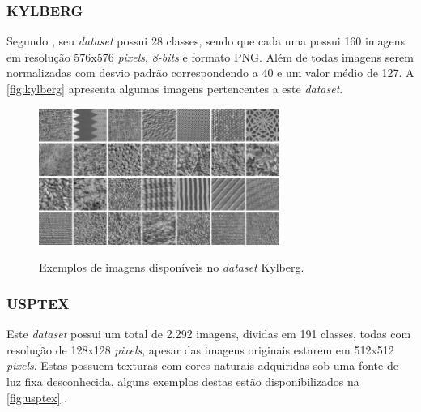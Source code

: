 \subsubsection{KYLBERG}
\label{subsubsec:kylberg}

\par Segundo , seu \textit{dataset} possui 28 classes, sendo que cada uma possui 160 imagens em resolução 576x576 \textit{pixels}, \textit{8-bits} e formato PNG. Além de todas imagens serem normalizadas com desvio padrão correspondendo a 40 e um valor médio de 127. A \autoref{fig:kylberg} apresenta algumas imagens pertencentes a este \textit{dataset}.

\begin{figure}[!h]
    \centering
    \caption{Exemplos de imagens disponíveis no \textit{dataset} Kylberg.}
    \includegraphics[width=0.7\textwidth]{./dados/figuras/kylberg.jpg}
    \label{fig:kylberg}
\end{figure}


\subsubsection{USPTEX}
\label{subsubsec:usptex}

\par Este \textit{dataset} possui um total de 2.292 imagens, dividas em 191 classes, todas com resolução de 128x128 \textit{pixels}, apesar das imagens originais estarem em 512x512 \textit{pixels}. Estas possuem texturas com cores naturais adquiridas sob uma fonte de luz fixa desconhecida, alguns exemplos destas estão disponibilizados na \autoref{fig:usptex} \cite{usptex}.

